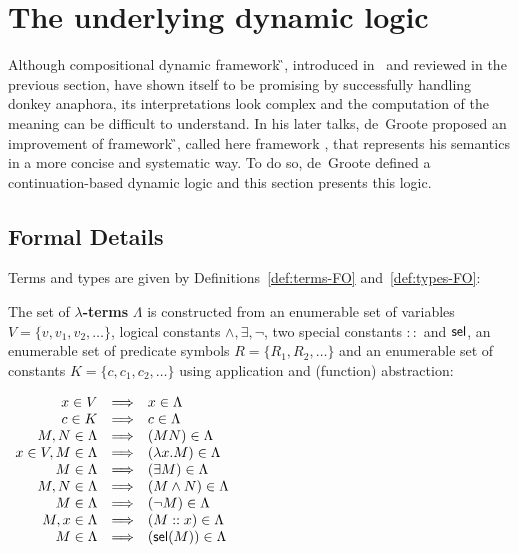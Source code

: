 \section{The underlying dynamic logic} \label{sec:dyn_log}

Although compositional dynamic framework {\G}, introduced in~\cite{deGroote:2006:Towards-a-Montagovian-Account-of-Dynamics} and reviewed in the previous section, have shown itself to be promising by successfully handling donkey anaphora, its interpretations look complex and the computation of the meaning can be difficult to understand. In his later talks, de~Groote proposed an improvement of framework {\G}, called here framework {\GN}, that represents his semantics in a more concise and systematic way. To do so, de~Groote defined a continuation-based dynamic logic and this section presents this logic.

\subsection{Formal Details}

Terms and types are given by Definitions~\ref{def:terms-FO} and~\ref{def:types-FO}:
\begin{definition}\label{def:FO-lambda-terms}
 The set of \textbf{$\lambda$-terms} $\Lambda$ is constructed from an enumerable set of variables $V = \{ v, v_1, v_2, \dots \}$, logical constants $\land, \exists, \neg$, two special constants $::$ and $\mathsf{sel}$, an enumerable set of predicate symbols $R = \{ R_1, R_2, \dots  \}$ and an enumerable set of constants $K = \{ c, c_1, c_2, \dots \}$  using application and (function) abstraction:
\begin{center}
$
\begin{array}{rcl}
x \in V & \Longrightarrow & x \in \Lambda\\
c \in K & \Longrightarrow & c \in \Lambda\\
M,N \in \Lambda &  \Longrightarrow & (MN) \in \Lambda\\ 
 x \in V, M \in \Lambda&  \Longrightarrow  & (\lambda x.M) \in \Lambda \\
  M \in \Lambda&  \Longrightarrow  & (\exists M) \in \Lambda\\ 
M,N \in \Lambda &  \Longrightarrow  & (M \land N) \in \Lambda \\
M \in \Lambda &  \Longrightarrow  & (\neg M)  \in \Lambda \\
M,x \in \Lambda &  \Longrightarrow  & (M::x) \in \Lambda\\
M \in \Lambda &  \Longrightarrow  & (\mathsf{sel}(M))  \in \Lambda
\end{array} 
$
\end{center}
\label{def:terms-FO}
\end{definition}

